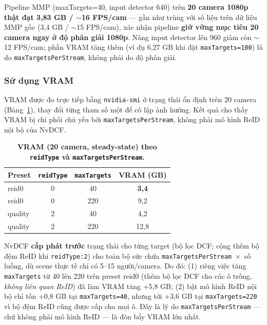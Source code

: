 \documentclass{article} %
\begin{document}
Pipeline MMP (maxTargets=40, input detector 640) trên \textbf{20 camera 1080p thật đạt 3,83 GB / $\sim$16 FPS/cam} --- gần như trùng với số liệu trên dữ liệu MMP gốc (3,4 GB / $\sim$15 FPS/cam), xác nhận pipeline \textbf{giữ vững mục tiêu 20 camera ngay ở độ phân giải 1080p}. Nâng input detector lên 960 giảm còn $\sim$12 FPS/cam; phần VRAM tăng thêm (ví dụ 6,27 GB khi đặt \texttt{maxTargets=100}) là do \texttt{maxTargetsPerStream}, không phải do độ phân giải.

\subsubsection{Sử dụng VRAM}

VRAM được đo trực tiếp bằng \texttt{nvidia-smi} ở trạng thái ổn định trên 20 camera (Bảng~\ref{tab:vram_preset}), thay đổi từng tham số một để cô lập ảnh hưởng. Kết quả cho thấy VRAM bị chi phối chủ yếu bởi \texttt{maxTargetsPerStream}, không phải mô hình ReID nội bộ của NvDCF.

\begin{table}[H]
    \centering
    \caption[Phân rã VRAM theo preset và maxTargetsPerStream]{\bfseries\fontsize{12pt}{0pt}\selectfont VRAM (20 camera, steady-state) theo \texttt{reidType} và \texttt{maxTargetsPerStream}.}
    \begin{tabular}{|l|c|c|c|}
    \hline
    \bfseries Preset & \bfseries \texttt{reidType} & \bfseries \texttt{maxTargets} & \bfseries VRAM (GB) \\
    \hline
    reid0   & 0 & 40  & \textbf{3,4} \\
    reid0   & 0 & 220 & 9,2 \\
    quality & 2 & 40  & 4,2 \\
    quality & 2 & 220 & 12,8 \\
    \hline
    \end{tabular}
    \label{tab:vram_preset}
\end{table}

NvDCF \textbf{cấp phát trước} trạng thái cho từng target (bộ lọc DCF; cộng thêm bộ đệm ReID khi \texttt{reidType:2}) cho toàn bộ sức chứa \texttt{maxTargetsPerStream}~$\times$~số luồng, dù scene thực tế chỉ có 5--15 người/camera. Do đó: (1) riêng việc tăng \texttt{maxTargets} từ 40 lên 220 trên preset reid0 (thêm bộ lọc DCF cho các ô trống, \textit{không liên quan ReID}) đã làm VRAM tăng +5,8 GB; (2) bật mô hình ReID nội bộ chỉ tốn +0,8 GB tại \texttt{maxTargets=40}, nhưng tới +3,6 GB tại \texttt{maxTargets=220} vì bộ đệm ReID cũng được cấp cho mọi ô. Đây là lý do \texttt{maxTargetsPerStream} --- chứ không phải mô hình ReID --- là đòn bẩy VRAM lớn nhất.
\end{document}
